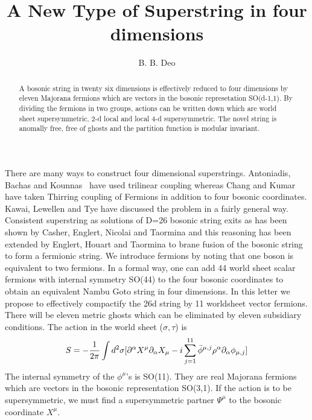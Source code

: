 \documentclass[a4paper,showpacs,preprintnumbers,amsmath,amssymb]{revtex4}
\begin{document}
\title{\bf A New Type of Superstring in four dimensions}
\medskip
\author{B. B. Deo}
\begin{abstract}
A bosonic string in twenty six dimensions is effectively 
reduced to four dimensions by eleven Majorana fermions which are vectors 
in the bosonic represetation SO(d-1,1). By dividing 
the fermions in two groups,  actions can be written down which are world sheet
supersymmetric, 2-d local  
and local 4-d supersymmetric. The novel string is anomally free, 
free of ghosts and the partition function is modular invariant.
\end{abstract}
\maketitle
There are many ways to construct four dimensional superstrings. Antoniadis, Bachas and
Kounnas~\cite{Int} have used trilinear coupling whereas Chang and Kumar~\cite{ch}
have taken Thirring coupling of Fermions in addition to four bosonic coordinates.
Kawai, Lewellen and Tye \cite{ka} have discussed the problem in a fairly general way. 
Consistent superstring as solutions of D=26 bosonic string exits as has been shown 
by Casher, Englert, Nicolai and Taormina \cite{cas} and this reasoning has been 
extended by Englert, Houart and Taormina \cite{en} to  brane fusion of the bosonic 
string to form a fermionic string. We introduce fermions by noting that one boson is 
equivalent to two fermions. In a formal way, one can add 44 world sheet scalar fermions 
with internal symmetry
SO(44) to the four bosonic 
coordinates to obtain an equivalent Nambu Goto string in four dimensions. In 
this letter we propose to effectively compactify the 26d string by 11 
worldsheet vector fermions. There will be eleven metric ghosts which can be 
eliminated by eleven subsidiary conditions. 
The action in the world sheet ($\sigma,\tau$) is
\begin{equation}
S= -\frac{1}{2\pi}\int d^2\sigma[\partial^{\alpha}X^{\mu}\partial_{\alpha}X_{\mu}
-i \sum^{11}_{j=1}\bar\phi^{\mu,j}\rho^{\alpha}\partial_{\alpha}\phi_{\mu,j}]\label{q}\\
\end{equation}
The internal symmetry of the  $\phi^{\mu}$'s is SO(11). They are real Majorana fermions
which are vectors in the bosonic representation SO(3,1). If the action is to be supersymmetric,
we must find a supersymmetric partner $\Psi^{\mu}$ to the bosonic coordinate $X^{\mu}$.
\end{document}
